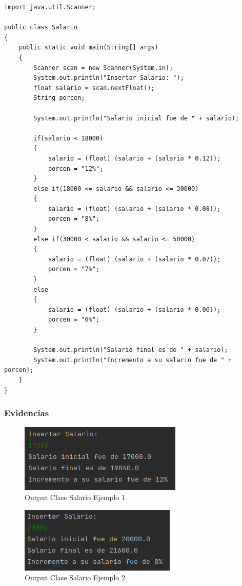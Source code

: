 \documentclass{article}
\begin{document}
\begin{lstlisting}
import java.util.Scanner;

public class Salario
{
	public static void main(String[] args)
	{
		Scanner scan = new Scanner(System.in);
		System.out.println("Insertar Salario: ");
		float salario = scan.nextFloat();
		String porcen;
		
		System.out.println("Salario inicial fue de " + salario);
		
		if(salario < 18000)
		{
			salario = (float) (salario + (salario * 0.12));
			porcen = "12%";
		}
		else if(18000 <= salario && salario <= 30000)
		{
			salario = (float) (salario + (salario * 0.08));
			porcen = "8%";
		}
		else if(30000 < salario && salario <= 50000)
		{
			salario = (float) (salario + (salario * 0.07));
			porcen = "7%";
		}
		else
		{
			salario = (float) (salario + (salario * 0.06));
			porcen = "6%";
		}
		
		System.out.println("Salario final es de " + salario);
		System.out.println("Incremento a su salario fue de " + porcen);
	}
}	
\end{lstlisting}

\subsubsection{Evidencias}

\begin{figure}[h]
	\centering
	\includegraphics[scale = 1]{images/salario1.png}
	\caption{Output Clase Salario Ejemplo 1}
\end{figure}

\begin{figure}[h]
	\centering
	\includegraphics[scale = 1]{images/salario2.png}
	\caption{Output Clase Salario Ejemplo 2}
\end{figure}
\newpage
\end{document}
